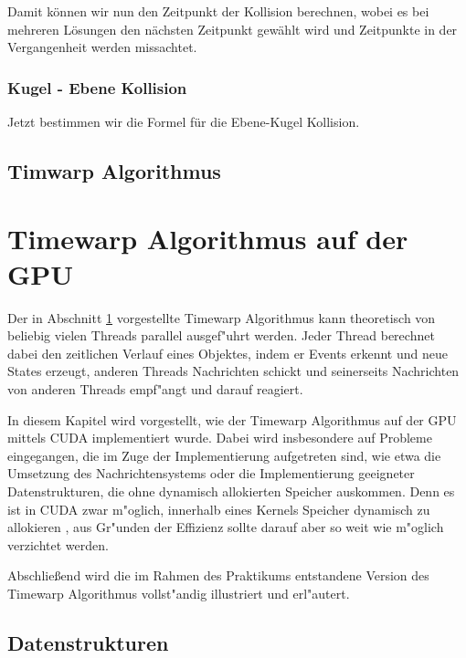 \documentclass[a4paper, 10pt, openright, parskip, chapterprefix]{scrreprt}
\begin{document}
\noindent Damit können wir nun den Zeitpunkt der Kollision berechnen, wobei es bei mehreren Lösungen den nächsten Zeitpunkt gewählt wird und Zeitpunkte in der Vergangenheit werden missachtet. 

\subsection{Kugel - Ebene Kollision}
Jetzt bestimmen wir die Formel für die Ebene-Kugel Kollision.
\section{Timwarp Algorithmus}
\label{sec:TimewarpAlgoritmus}




\chapter{Timewarp Algorithmus auf der GPU}
Der in Abschnitt \ref{sec:TimewarpAlgoritmus} vorgestellte Timewarp Algorithmus kann theoretisch von beliebig vielen Threads
parallel ausgef"uhrt werden. Jeder Thread berechnet dabei den zeitlichen Verlauf eines Objektes, indem er Events erkennt
und neue States erzeugt, anderen Threads Nachrichten schickt und seinerseits Nachrichten von anderen Threads empf"angt
und darauf reagiert. 

In diesem Kapitel wird vorgestellt, wie der Timewarp Algorithmus auf der GPU mittels CUDA implementiert wurde. Dabei wird
insbesondere auf Probleme eingegangen, die im Zuge der Implementierung aufgetreten sind, wie etwa die Umsetzung des
Nachrichtensystems oder die Implementierung geeigneter Datenstrukturen, die ohne dynamisch allokierten Speicher
auskommen. Denn es ist in CUDA zwar m"oglich, innerhalb eines Kernels Speicher dynamisch zu allokieren \cite{...}, aus
Gr"unden der Effizienz sollte darauf aber so weit wie m"oglich verzichtet werden.

Abschlie\ss end wird die im Rahmen des Praktikums entstandene Version des Timewarp Algorithmus vollst"andig illustriert
und erl"autert.

\section{Datenstrukturen}
\end{document}
